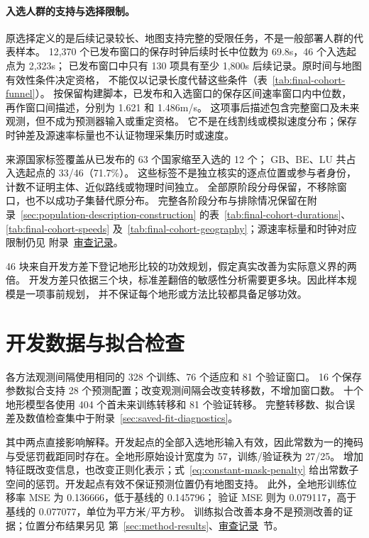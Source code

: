 \paragraph{入选人群的支持与选择限制。}\label{sec:population-support-summary}\hypertarget{sec:population-support-summary}{}
原选择定义的是后续记录较长、地图支持完整的受限任务，不是一般部署人群的代表样本。
12,370 个已发布窗口的保存时钟后续时长中位数为 69.8s，46 个入选起点为 2,323s；
已发布窗口中只有 130 项具有至少 1,800s 后续记录。原时间与地图有效性条件决定资格，
不能仅以记录长度代替这些条件（表~\ref{tab:final-cohort-funnel}）。
按保留构建脚本，已发布和入选窗口的保存区间速率窗口内中位数，
再作窗口间描述，分别为 1.621 和 1.486m/s。
这项事后描述包含完整窗口及未来观测，但不成为预测器输入或重定资格。
它不是在线割线或模拟速度分布；保存时钟差及源速率标量也不认证物理采集历时或速度。

来源国家标签覆盖从已发布的 63 个国家缩至入选的 12 个；
GB、BE、LU 共占入选起点的 33/46（71.7\%）。
这些标签不是独立核实的逐点位置或参与者身份，计数不证明主体、近似路线或物理时间独立。
全部原阶段分母保留，不移除窗口，也不以成功子集替代原分布。
完整各阶段分布与排除情况保留在附录~\ref{sec:population-description-construction}
的表~\ref{tab:final-cohort-durations}、\ref{tab:final-cohort-speeds}
及~\ref{tab:final-cohort-geography}；源速率标量和时钟对应限制仍见
附录~\href{audit-notes.pdf\#sec:source-reconciliation-details}{审查记录}。

46 块来自开发方差下登记地形比较的功效规划，假定真实改善为实际意义界的两倍。
开发方差只依据三个块，标准差翻倍的敏感性分析需要更多块。因此样本规模是一项事前规划，
并不保证每个地形或方法比较都具备足够功效。


\section{开发数据与拟合检查}
\label{sec:development-fit-summary}\hypertarget{sec:development-fit-summary}{}
各方法观测间隔使用相同的 328 个训练、76 个适应和 81 个验证窗口。
16 个保存参数拟合支持 28 个预测配置；改变观测间隔会改变转移数，不增加窗口数。
十个地形模型各使用 404 个首未来训练转移和 81 个验证转移。
完整转移数、拟合误差及数值检查集中于附录~\ref{sec:saved-fit-diagnostics}。

其中两点直接影响解释。开发起点的全部入选地形输入有效，因此常数为一的掩码
与受惩罚截距同时存在。全地形原始设计宽度为 57，训练/验证秩为 27/25。
增加特征既改变信息，也改变正则化表示；式~\eqref{eq:constant-mask-penalty}
给出常数子空间的惩罚。开发起点有效不保证预测位置仍有地图支持。
此外，全地形训练位移率 MSE 为 0.136666，低于基线的 0.145796；
验证 MSE 则为 0.079117，高于基线的 0.077077，单位为平方米/平方秒。
训练拟合改善本身不是预测改善的证据；位置分布结果另见
第~\ref{sec:method-results}、\href{audit-notes.pdf\#sec:terrain-results}{审查记录}~节。


